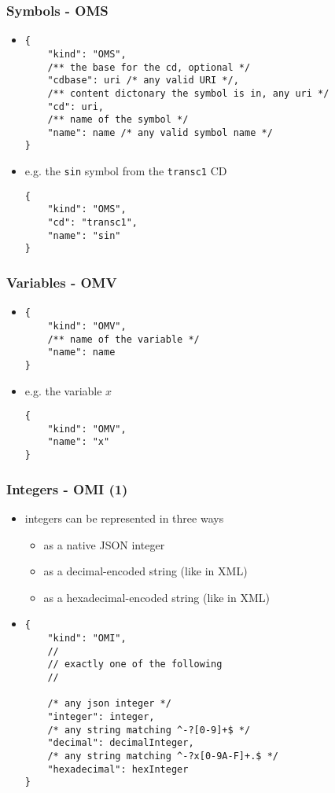 \documentclass[usenames,dvipsnames]{beamer}
\begin{document}
\begin{frame}[fragile]
    \frametitle{Symbols - OMS}
    \begin{itemize}
        \item
\begin{lstlisting}
{
    "kind": "OMS",
    /** the base for the cd, optional */
    "cdbase": uri /* any valid URI */, 
    /** content dictonary the symbol is in, any uri */
    "cd": uri,
    /** name of the symbol */
    "name": name /* any valid symbol name */
}
\end{lstlisting}
        \item e.g. the \texttt{sin} symbol from the \texttt{transc1} CD
\begin{lstlisting}
{
    "kind": "OMS",
    "cd": "transc1",
    "name": "sin"
}
\end{lstlisting}
    \end{itemize}
\end{frame}

\begin{frame}[fragile]
    \frametitle{Variables - OMV}
\begin{itemize}
        \item
        \begin{lstlisting}
{
    "kind": "OMV",
    /** name of the variable */
    "name": name
}
\end{lstlisting}
        \item e.g. the variable $x$
\begin{lstlisting}
{
    "kind": "OMV",
    "name": "x"
}
\end{lstlisting}
    \end{itemize}
\end{frame}

\begin{frame}[fragile]
    \frametitle{Integers - OMI (1)}
    \begin{itemize}
        \item integers can be represented in three ways
        \begin{itemize}
            \item as a native JSON integer
            \item as a decimal-encoded string (like in XML)
            \item as a hexadecimal-encoded string (like in XML)
        \end{itemize}
        \item 
\begin{lstlisting}
{
    "kind": "OMI",
    //
    // exactly one of the following
    //

    /* any json integer */
    "integer": integer,
    /* any string matching ^-?[0-9]+$ */
    "decimal": decimalInteger,
    /* any string matching ^-?x[0-9A-F]+.$ */
    "hexadecimal": hexInteger
}
\end{lstlisting}
    \end{itemize}
\end{frame}
\end{document}
